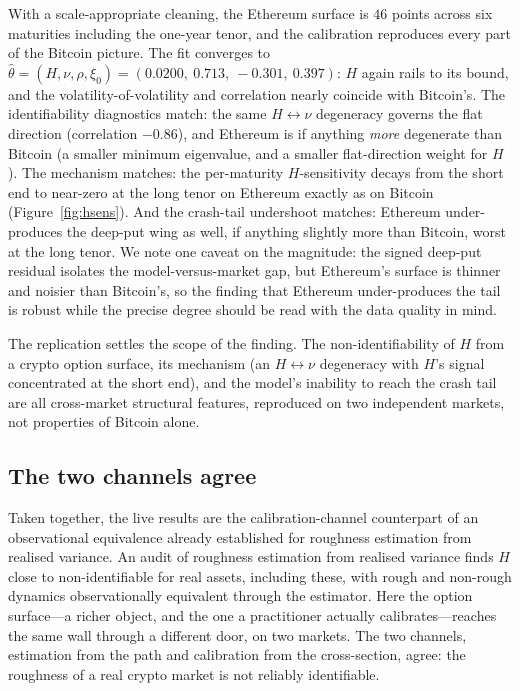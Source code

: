 \documentclass[namedate,webpdf]{ima-authoring-template}
\numberwithin{equation}{section}
\begin{document}
With a scale-appropriate cleaning, the Ethereum surface is $46$ points across six maturities including
the one-year tenor, and the calibration reproduces every part of the Bitcoin picture. The fit converges
to $\hat\theta = (H,\nu,\rho,\xi_0) = (0.0200,\ 0.713,\ -0.301,\ 0.397)$: $H$ again rails to its bound,
and the volatility-of-volatility and correlation nearly coincide with Bitcoin's. The identifiability
diagnostics match: the same $H\leftrightarrow\nu$ degeneracy governs the flat direction (correlation
$-0.86$), and Ethereum is if anything \emph{more} degenerate than Bitcoin (a smaller minimum
eigenvalue, and a smaller flat-direction weight for $H$). The mechanism matches: the per-maturity
$H$-sensitivity decays from the short end to near-zero at the long tenor on Ethereum exactly as on
Bitcoin (Figure~\ref{fig:hsens}). And the crash-tail undershoot matches: Ethereum under-produces the
deep-put wing as well, if anything slightly more than Bitcoin, worst at the long tenor. We note one
caveat on the magnitude: the signed deep-put residual isolates the model-versus-market gap, but
Ethereum's surface is thinner and noisier than Bitcoin's, so the finding that Ethereum under-produces
the tail is robust while the precise degree should be read with the data quality in mind.

The replication settles the scope of the finding. The non-identifiability of $H$ from a crypto option
surface, its mechanism (an $H\leftrightarrow\nu$ degeneracy with $H$'s signal concentrated at the
short end), and the model's inability to reach the crash tail are all cross-market structural
features, reproduced on two independent markets, not properties of Bitcoin alone.

\subsection{The two channels agree}

Taken together, the live results are the calibration-channel counterpart of an observational
equivalence already established for roughness estimation from realised variance. An audit of roughness
estimation from realised variance finds $H$ close to non-identifiable for real assets, including these,
with rough and non-rough dynamics observationally equivalent through the estimator. Here the option
surface---a richer object, and the one a practitioner actually calibrates---reaches the same wall
through a different door, on two markets. The two channels, estimation from the path and calibration
from the cross-section, agree: the roughness of a real crypto market is not reliably identifiable.
\end{document}
